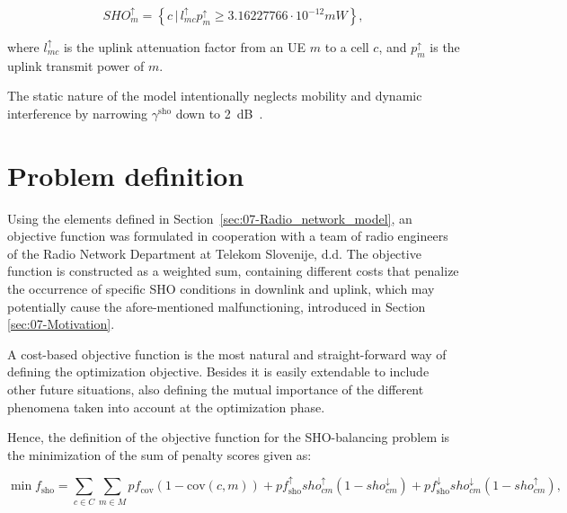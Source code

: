 \begin{equation}
SHO_{m}^{\uparrow}=\left\{ c\,\vert\, l_{mc}^{\uparrow}p_{m}^{\uparrow}\ge3.16227766\cdot10^{-12}mW\right\} ,
\end{equation}



\noindent where $l_{mc}^{\uparrow}$ is the uplink attenuation factor
from an UE $m$ to a cell $c$, and $p_{m}^{\uparrow}$
is the uplink transmit power of $m$.

The static nature of the model intentionally neglects mobility and
dynamic interference by narrowing $\gamma^{\mathrm{sho}}$ down to
2~dB~\cite{nawrocki2006understanding}.


\section{Problem definition \label{sec:07-Problem_definition}}

Using the elements defined in Section~\ref{sec:07-Radio_network_model},
an objective function was formulated in cooperation with a team of
radio engineers of the Radio Network Department at Telekom Slovenije,
d.d. The objective function is constructed as a weighted sum, containing
different costs that penalize the occurrence of specific SHO conditions
in downlink and uplink, which may potentially cause the afore-mentioned
malfunctioning, introduced in Section \ref{sec:07-Motivation}.

A cost-based objective function is the most natural and straight-forward
way of defining the optimization objective. Besides it is easily extendable
to include other future situations, also defining the mutual importance
of the different phenomena taken into account at the optimization
phase.

Hence, the definition of the objective function for the SHO-balancing
problem is the minimization of the sum of penalty scores given as:

\begin{equation}
\min f_{\mathrm{sho}}=\sum_{c\in C}\sum_{m\in M}pf_{\mathrm{cov}}(1-\mathrm{cov}(c,m))+pf_{\mathrm{sho}}^{\uparrow}sho_{cm}^{\uparrow}(1-sho_{cm}^{\downarrow})+pf_{\mathrm{sho}}^{\downarrow}sho_{cm}^{\downarrow}(1-sho_{cm}^{\uparrow}),\label{eq:07-objective_function}
\end{equation}


